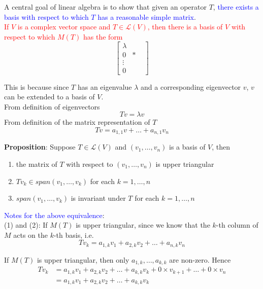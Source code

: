 \documentclass[a4paper, 10pt]{report}
\begin{document}
A central goal of linear algebra is to show that given an operator $T$, \textcolor{blue}{there exists a basis with respect to which $T$ has a reasonable simple matrix}. \\ 

\textcolor{red}{If $V$ is a complex vector space and $T \in \mathcal{L}(V)$, then there is a basis of  $V$ with respect to which $M(T)$ has the form} 
 \[
  \begin{bmatrix} 
     \lambda & & \\
     0 & * & \\
     \vdots & & \\
     0 & &
  \end{bmatrix}
\] 

This is because since $T $ has an eigenvalue $\lambda$ and a corresponding eigenvector $v$,  $v$ can be extended to a basis of $V$. \\

From definition of eigenvectors
\[
   Tv = \lambda v
\] 
From definition of the matrix representation of $T$ 
\[
   Tv = a_{1, 1} v + \hdots + a_{n, 1}v_n
\] 

\begin{framed}
   \textbf{Proposition}: Suppose $T \in \mathcal{L}(V)$  and $(v_1, \hdots, v_n)$ is a basis of $V$, then 
   \begin{enumerate}
      \item the matrix of $T$ with respect to $(v_1, \hdots, v_n)$ is upper triangular
      \item $Tv_k \in span(v_1, \hdots, v_k)$ for each $k = 1, \hdots, n$ 
      \item  $span(v_1, \hdots, v_k)$ is invariant under $T$ for each $k = 1, \hdots, n$
   \end{enumerate}
\end{framed}

\textcolor{blue}{Notes for the above equivalence}:  \\

(1) and (2): If $M(T)$ is upper triangular, since we know that the $k$-th column of $M$ acts on the  $k$-th basis, i.e.
\[
   Tv_k = a_{1, k} v_1 + a_{2, k} v_2 +  \hdots + a_{n, k} v_n
\] 

If $M(T)$ is upper triangular, then only $a_{1, k}, \hdots, a_{k, k}$ are non-zero. Hence
\begin{align*}
   Tv_k &= a_{1, k} v_1 + a_{2, k} v_2 +  \hdots + a_{k, k} v_k + 0 \times v_{k + 1} + \hdots + 0 \times v_{n} \\
        &= a_{1, k} v_1 + a_{2, k} v_2 +  \hdots + a_{k, k} v_k
\end{align*}
\end{document}

